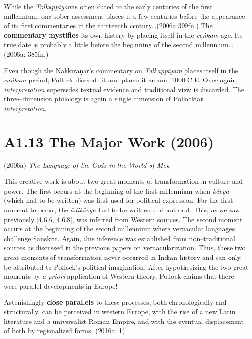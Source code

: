 \begin{myquote}
While the \textit{Tolkāppiyam}is often dated to the early centuries of the first millennium, one sober assessment places it a few centuries before the appearance of its first commentaries in the thirteenth century…(2006a:399fn.) The \textbf{commentary mystifies} its own history by placing itself in the \textit{caṅkam} age. Its true date is probably a little before the beginning of the second millennium…(2006a: 385fn.)
\end{myquote}

Even though the Nakkīraṇār’s commentary on \textit{Tolkāppiyam }places itself in the \textit{caṅkam} period, Pollock discards it and places it around 1000 C.E. Once again, \textit{interpretation} supersedes textual evidence and traditional view is discarded. The three–dimension philology is again a single dimension of Pollockian \textit{interpretation}.


\vspace{-.3cm}

\section*{A1.13 The Major Work (2006)}

(2006a)\textit{ The Language of the Gods in the World of Men}

This creative work is about two great moments of transformation in culture and power. The first occurs at the beginning of the first millennium when \textit{kāvya }(which had to be written) was first used for political expression. For the first moment to occur, the\textit{ ādikāvya }had to be written and not oral. This, as we saw previously [4.6.6, 4.6.8], was inferred from Western sources. The second moment occurs at the beginning of the second millennium where vernacular languages challenge Sanskrit. Again, this inference was established from non–traditional sources as discussed in the previous papers on vernacularization. Thus, these two great moments of transformation never occurred in Indian history and can only be attributed to Pollock’s political imagination. After hypothesizing the two great moments by \textit{a priori} application of Western theory, Pollock claims that there were parallel developments in Europe!

\begin{myquote}
Astonishingly \textbf{close parallels} to these processes, both chronologically and structurally, can be perceived in western Europe, with the rise of a new Latin literature and a universalist Roman Empire, and with the eventual displacement of both by regionalized forms. (2016a: 1)
\end{myquote}

